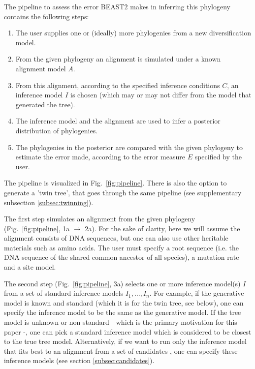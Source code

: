 The pipeline to assess the error BEAST2 makes in inferring this phylogeny 
contains the following steps:
\begin{enumerate}
  \item The user supplies one or (ideally) more phylogenies from a 
    new diversification model.
  \item From the given phylogeny an alignment is simulated 
    under a known alignment model $\mathit{A}$.
  \item From this alignment, according to the specified 
    inference conditions $\mathit{C}$, 
    an inference model $\mathit{I}$ is chosen (which may or may not differ 
    from the model that generated the tree).
  \item The inference model and the alignment are used 
    to infer a posterior distribution of phylogenies.
  \item The phylogenies in the posterior are compared with the given phylogeny 
    to estimate the error made, according to 
    the error measure $\mathit{E}$ specified by the user.
\end{enumerate}

The pipeline is visualized in Fig.~\ref{fig:pipeline}. 
There is also the option to generate a 'twin tree', 
that goes through the same pipeline (see supplementary subsection \ref{subsec:twinning}). 

The first step simulates an alignment from the given 
phylogeny (Fig.~\ref{fig:pipeline}, 1a $\rightarrow$ 2a).
For the sake of clarity, here we will assume the alignment consists
of DNA sequences, but one can also use other heritable materials such as amino acids.
The user must specify a root sequence (i.e. the DNA sequence of the shared 
common ancestor of all species), a mutation rate and a site model.

The second step (Fig.~\ref{fig:pipeline}, 3a)
selects one or more inference model(s) $I$ from 
a set of standard inference models $I_{1},\dots,I_{n}$.
For example, if the generative model is known and standard (which it is for the twin tree, see below),
one can specify the inference model to be the same as the generative model.
If the tree model is unknown or non-standard - which is the primary 
motivation for this paper -, one can pick
a standard inference model which is considered 
to be closest to the true tree model.
Alternatively, if we want to run only the inference
model that fits best to an alignment from a set of candidates ,
one can specify these inference models (see section \ref{subsec:candidates}).

